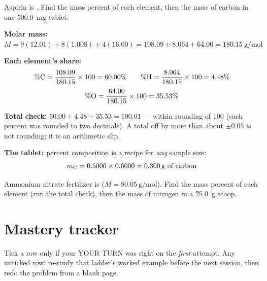 \documentclass{apchem-worksheet}
\begin{document}
\begin{workedexample}
Aspirin is . Find the mass percent of each element, then the
mass of carbon in one \SI{500.0}{\milli\gram} tablet.

\textbf{Molar mass:}
$M = 9(12.01) + 8(1.008) + 4(16.00) = 108.09 + 8.064 + 64.00 =
\SI{180.15}{\gram\per\mole}$

\textbf{Each element's share:}
\[ \%\ce{C} = \frac{108.09}{180.15} \times 100 = 60.00\% \qquad
   \%\ce{H} = \frac{8.064}{180.15} \times 100 = 4.48\% \]
\[ \%\ce{O} = \frac{64.00}{180.15} \times 100 = 35.53\% \]

\textbf{Total check:} $60.00 + 4.48 + 35.53 = 100.01$ --- within rounding
of 100 (each percent was rounded to two decimals). A total off by more
than about $\pm 0.05$ is not rounding; it is an arithmetic slip.

\textbf{The tablet:} percent composition is a recipe for \emph{any}
sample size:
\[ m_{\ce{C}} = 0.5000 \times 0.6000 = \SI{0.300}{\gram}~\text{of carbon} \]
\end{workedexample}

\begin{yourturn}
Ammonium nitrate fertilizer is 
($M = \SI{80.05}{\gram\per\mole}$). Find the mass percent of each
element (run the total check), then the mass of nitrogen in a
\SI{25.0}{\gram} scoop. \workspace[4cm]
\end{yourturn}

\section*{\sffamily Mastery tracker}

Tick a row only if your YOUR TURN was right on the \emph{first} attempt.
Any unticked row: re-study that ladder's worked example before the next
session, then redo the problem from a blank page.
\end{document}
